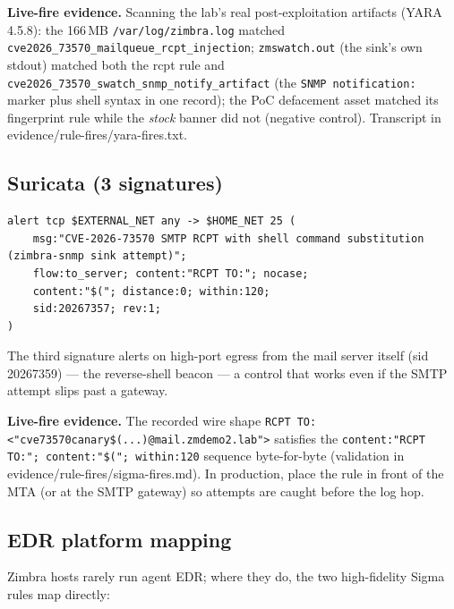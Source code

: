 \textbf{Live-fire evidence.} Scanning the lab's real post-exploitation artifacts
(YARA 4.5.8): the 166\,MB \texttt{/var/log/zimbra.log} matched
\texttt{cve2026\_73570\_mailqueue\_rcpt\_injection};
\texttt{zmswatch.out} (the sink's own stdout) matched both the rcpt rule and
\texttt{cve2026\_73570\_swatch\_snmp\_notify\_artifact} (the
\texttt{SNMP notification:} marker plus shell syntax in one record); the PoC
defacement asset matched its fingerprint rule while the \emph{stock} banner
did not (negative control). Transcript in evidence/rule-fires/yara-fires.txt.

\subsection{Suricata (3 signatures)}

\begin{lstlisting}[style=shell,caption={Suricata: SMTP attempt on the wire (sids 20267357/20267358)}]
alert tcp $EXTERNAL_NET any -> $HOME_NET 25 (
    msg:"CVE-2026-73570 SMTP RCPT with shell command substitution (zimbra-snmp sink attempt)";
    flow:to_server; content:"RCPT TO:"; nocase;
    content:"$("; distance:0; within:120;
    sid:20267357; rev:1;
)
\end{lstlisting}

The third signature alerts on high-port egress from the mail server itself
(sid 20267359) — the reverse-shell beacon — a control that works even if the
SMTP attempt slips past a gateway.

\textbf{Live-fire evidence.} The recorded wire shape
\texttt{RCPT TO: <"cve73570canary\$(...)@mail.zmdemo2.lab">} satisfies the
\texttt{content:"RCPT TO:"; content:"\$("; within:120} sequence
byte-for-byte (validation in evidence/rule-fires/sigma-fires.md). In
production, place the rule in front of the MTA (or at the SMTP gateway) so
attempts are caught before the log hop.

\subsection{EDR platform mapping}

Zimbra hosts rarely run agent EDR; where they do, the two high-fidelity
Sigma rules map directly:

